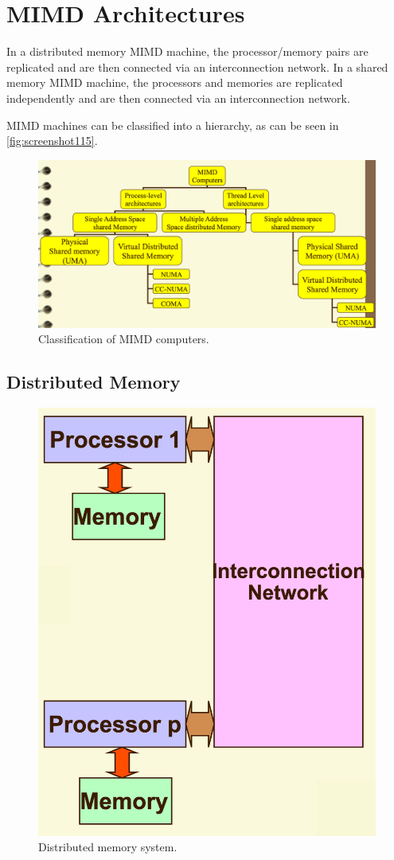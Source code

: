 \chapter{MIMD Architectures}
In a distributed memory MIMD machine, the processor/memory pairs are replicated and are then connected via an interconnection network. In a shared memory MIMD machine, the processors and memories are replicated independently and are then connected via an interconnection network.

MIMD machines can be classified into a hierarchy, as can be seen in \autoref{fig:screenshot115}.

\begin{figure}
\centering
\includegraphics[width=0.7\linewidth]{figures/screenshot115}
\caption{Classification of MIMD computers.}
\label{fig:screenshot115}
\end{figure}

\section{Distributed Memory}
\begin{figure}
\centering
\includegraphics[width=0.7\linewidth]{figures/screenshot110}
\caption{Distributed memory system.}
\label{fig:screenshot110}
\end{figure}

